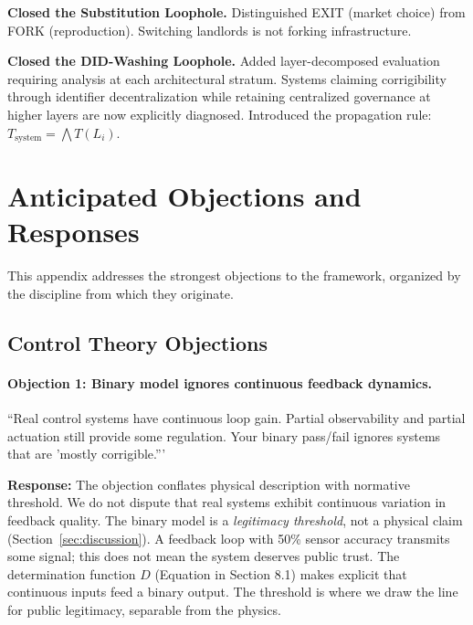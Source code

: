 \begin{description}[style=nextline, leftmargin=1em, labelindent=0pt]
\item[\textbf{Version 1.6.2 (Reproduction)}]
\textbf{Closed the Substitution Loophole.} Distinguished EXIT (market choice) from FORK (reproduction). Switching landlords is not forking infrastructure.

\item[\textbf{Version 1.7 (Layering)}]
\textbf{Closed the DID-Washing Loophole.} Added layer-decomposed evaluation requiring analysis at each architectural stratum. Systems claiming corrigibility through identifier decentralization while retaining centralized governance at higher layers are now explicitly diagnosed. Introduced the propagation rule: $T_{\text{system}} = \bigwedge T(L_i)$.

\end{description}

\section{Anticipated Objections and Responses}
\label{appendix:objections}

This appendix addresses the strongest objections to the framework, organized by the discipline from which they originate.

\subsection{Control Theory Objections}

\paragraph{Objection 1: Binary model ignores continuous feedback dynamics.}
``Real control systems have continuous loop gain. Partial observability and partial actuation still provide some regulation. Your binary pass/fail ignores systems that are 'mostly corrigible.'''

\textbf{Response:} The objection conflates physical description with normative threshold. We do not dispute that real systems exhibit continuous variation in feedback quality. The binary model is a \textit{legitimacy threshold}, not a physical claim (Section~\ref{sec:discussion}). A feedback loop with 50\% sensor accuracy transmits some signal; this does not mean the system deserves public trust. The determination function $D$ (Equation in Section 8.1) makes explicit that continuous inputs feed a binary output. The threshold is where we draw the line for public legitimacy, separable from the physics.

